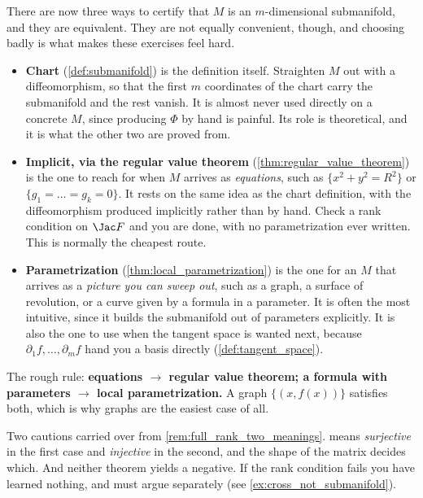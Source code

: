 \begin{remark}
\label{rem:three_submanifold_descriptions}
There are now three ways to certify that $M$ is an $m$-dimensional submanifold, and they are
equivalent. They are not equally convenient, though, and choosing badly is what makes these
exercises feel hard.

\begin{itemize}
  \item \textbf{Chart} (\cref{def:submanifold}) is the definition itself. Straighten $M$ out
    with a diffeomorphism, so that the first $m$ coordinates of the chart carry the submanifold
    and the rest vanish. It is almost never used directly on a concrete $M$, since producing
    $\Phi$ by hand is painful. Its role is theoretical, and it is what the other two are proved
    from.
  \item \textbf{Implicit, via the regular value theorem} (\cref{thm:regular_value_theorem}) is
    the one to reach for when $M$ arrives as \emph{equations}, such as $\{x^2+y^2=R^2\}$ or
    $\{g_1=\dots=g_k=0\}$. It rests on the same idea as the chart definition, with the
    diffeomorphism produced implicitly rather than by hand. Check a rank condition on $\Jac F$
    and you are done, with no parametrization ever written. This is normally the cheapest route.
  \item \textbf{Parametrization} (\cref{thm:local_parametrization}) is the one for an $M$ that
    arrives as a \emph{picture you can sweep out}, such as a graph, a surface of revolution, or
    a curve given by a formula in a parameter. It is often the most intuitive, since it builds
    the submanifold out of parameters explicitly. It is also the one to use when the tangent
    space is wanted next, because $\partial_1f,\dots,\partial_mf$ hand you a basis directly
    (\cref{def:tangent_space}).
\end{itemize}

The rough rule: \textbf{equations $\to$ regular value theorem; a formula with parameters $\to$
local parametrization.} A graph $\{(x,f(x))\}$ satisfies both, which is why graphs are the
easiest case of all.

Two cautions carried over from \cref{rem:full_rank_two_meanings}.  means
\emph{surjective} in the first case and \emph{injective} in the second, and the shape of the
matrix decides which. And neither theorem yields a negative. If the rank condition fails you
have learned nothing, and must argue separately (see \cref{ex:cross_not_submanifold}).
\end{remark}

